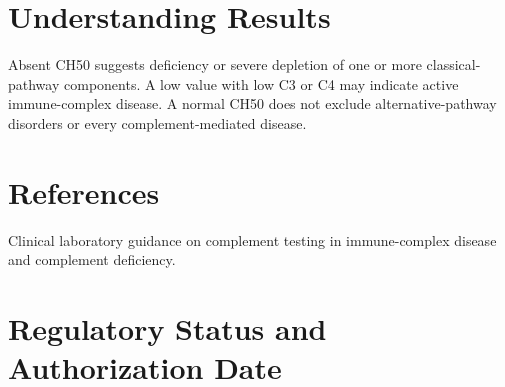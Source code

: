 \section*{Understanding Results}
Absent CH50 suggests deficiency or severe depletion of one or more classical-pathway components. A low value with low C3 or C4 may indicate active immune-complex disease. A normal CH50 does not exclude alternative-pathway disorders or every complement-mediated disease.

\section*{References}
Clinical laboratory guidance on complement testing in immune-complex disease and complement deficiency.

\clearpage


\section*{Regulatory Status and Authorization Date}

\clearpage
